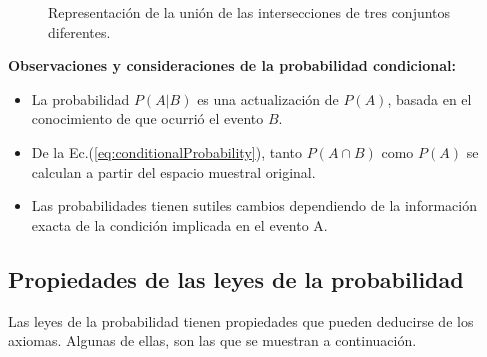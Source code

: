 \begin{figure}[h]
    \centering
{}
\caption{Representación de la unión de las intersecciones de tres conjuntos diferentes.}
\label{fig:unionIntersection}
\end{figure}


\textbf{Observaciones y consideraciones de la probabilidad condicional:}

\begin{itemize}
\item La probabilidad $P(A|B)$ es una actualización de $P(A)$, basada en el
conocimiento de que ocurrió el evento $B$.

\item De la Ec.(\ref{eq:conditionalProbability}), tanto $P(A \cap B)$ como
$P(A)$ se calculan a partir del espacio muestral original.

\item Las probabilidades tienen sutiles cambios dependiendo de la información
exacta de la condición implicada en el evento A.
\end{itemize}

\subsection{Propiedades de las leyes de la probabilidad}

Las leyes de la probabilidad tienen propiedades que pueden deducirse de los
axiomas. Algunas de ellas, son las que se muestran a continuación.

